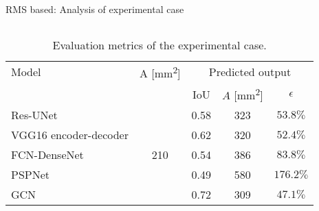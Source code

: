 \documentclass[10pt,aspectratio=169,dvipsnames]{beamer} %
\begin{document}
	\begin{frame}{RMS based: Analysis of experimental case}
		\begin{columns}[T]
			\begin{column}[t]{0.9\textwidth}
				\centering
				\begin{table}[!ht]
					\centering
					\caption{Evaluation metrics of the experimental case.}
					\label{tab:rms_exp_case_}
					\begin{tabular}{l@{\ }cccc}
						\toprule[1.5pt]
						\multicolumn{1}{l}{Model} & \multicolumn{1}{c}{A [mm\textsuperscript{2}]} & \multicolumn{3}{c}{Predicted output} \\ 
						\cmidrule(lr){3-5} & & \multicolumn{1}{c}{IoU} & \multicolumn{1}{c}{\(\hat{A}\) [mm\textsuperscript{2}]} & \(\epsilon\) \\ 
						\midrule
						Res-UNet & \multicolumn{1}{c}{\multirow{5}{*}{210}} & \multicolumn{1}{c}{0.58} & \multicolumn{1}{c}{323}  & \(53.8\%\) \\ 
						VGG16 encoder-decoder &  & \multicolumn{1}{c}{0.62} & \multicolumn{1}{c}{320} & \(52.4\%\) \\ 
						FCN-DenseNet &  & \multicolumn{1}{c}{0.54} & \multicolumn{1}{c}{386} & \(83.8\%\) \\ 
						PSPNet &  & \multicolumn{1}{c}{0.49} & \multicolumn{1}{c}{580} & \(176.2\%\) \\ 
						GCN &  & \multicolumn{1}{c}{0.72} & \multicolumn{1}{c}{309} & \(47.1\%\) \\ 
						\bottomrule[1.5pt]
					\end{tabular}		
				\end{table}			
			\end{column}
		\end{columns}			
	\end{frame}
\end{document}
